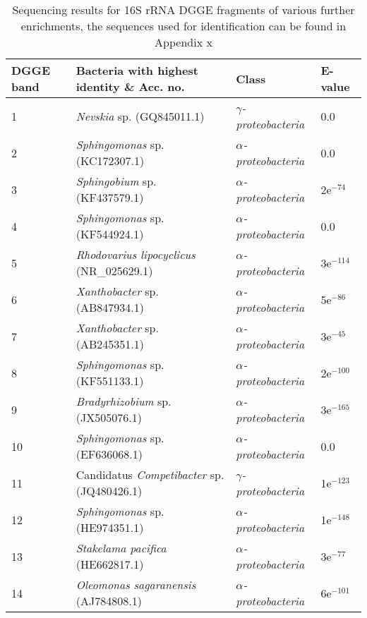 \documentclass[11pt]{article}
\begin{document}
\begin{sidewaystable}[!htbp]
\begin{tabular}{ | l | p{9cm} | p{4.5cm} | l | }
\hline
DGGE band & Bacteria with highest identity \& Acc. no. & Class & E-value \\
\hline
1 & \emph{Nevskia} sp. (GQ845011.1) & \emph{$\gamma$-proteobacteria} & 0.0  \\
\hline
2 & \emph{Sphingomonas} sp. (KC172307.1) & \emph{$\alpha$-proteobacteria} & 0.0 \\
\hline
3 & \emph{Sphingobium} sp. (KF437579.1) & \emph{$\alpha$-proteobacteria} & 2e$^{-74}$ \\
\hline
4 & \emph{Sphingomonas} sp. (KF544924.1) & \emph{$\alpha$-proteobacteria} & 0.0  \\
\hline
5 & \emph{Rhodovarius lipocyclicus} (NR\_025629.1) & \emph{$\alpha$-proteobacteria} & 3e$^{-114}$ \\
\hline
6 & \emph{Xanthobacter} sp. (AB847934.1) & \emph{$\alpha$-proteobacteria} & 5e$^{-86}$  \\
\hline
7 & \emph{Xanthobacter} sp. (AB245351.1) & \emph{$\alpha$-proteobacteria} & 3e$^{-45}$  \\
\hline
8 & \emph{Sphingomonas} sp.(KF551133.1) & \emph{$\alpha$-proteobacteria} & 2e$^{-100}$  \\
\hline
9 & \emph{Bradyrhizobium} sp. (JX505076.1) & \emph{$\alpha$-proteobacteria} & 3e$^{-165}$  \\
\hline
10 & \emph{Sphingomonas} sp. (EF636068.1) & \emph{$\alpha$-proteobacteria} & 0.0  \\
\hline
11 & Candidatus \emph{Competibacter} sp. (JQ480426.1) & \emph{$\gamma$-proteobacteria} & 1e$^{-123}$  \\
\hline
12 & \emph{Sphingomonas} sp. (HE974351.1) & \emph{$\alpha$-proteobacteria} &  1e$^{-148}$ \\
\hline
13 & \emph{Stakelama pacifica} (HE662817.1) & \emph{$\alpha$-proteobacteria} & 3e$^{-77}$  \\
\hline
14 & \emph{Oleomonas sagaranensis} (AJ784808.1) & \emph{$\alpha$-proteobacteria} & 6e$^{-101}$  \\
\hline
\end{tabular}
\caption{Sequencing results for 16S rRNA DGGE fragments of various further enrichments, the sequences used for identification can be found in Appendix x}
\end{sidewaystable}
\end{document}
